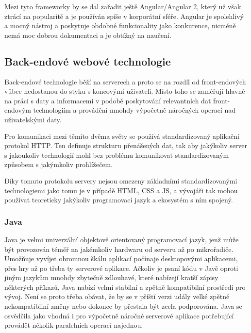 		Mezi tyto frameworky by se dal zařadit ještě Angular/Angular 2, který už však ztrácí na popularitě a je používán spíše v
		korporátní sféře.
		Angular je spolehlivý a mocný nástroj a poskytuje obdobné funkcionality jako konkurence,
		nicméně nemá moc dobrou dokumentaci a je obtížný na naučení. \cite{react_vs_angular}

	\subsection{Back-endové webové technologie}

	Back-endové technologie běží na serverech a proto se na rozdíl od front-endových vůbec nedostanou do styku s koncovými uživateli.
	Místo toho se zaměřují hlavně na práci s daty a informacemi v podobě poskytování relevantních dat front-endovým
	technologiím a provádění mnohdy výpočetně náročných operací nad uživatelskými daty.

	Pro komunikaci mezi těmito dvěma světy se používá standardizovaný aplikační protokol \noindent\Ac{HTTP}.
	Ten definuje strukturu přenášených dat, tak aby jakýkoliv server s jakoukoliv technologií mohl bez problému komunikovat
	standardizovaným způsobem s jakýmkoliv prohlížečem. \cite{http}

	Díky tomuto protokolu servery nejsou omezeny základními standardizovanými technologiemi jako tomu je v případě
	\Ac{HTML}, \Ac{CSS} a \ac{JS}, a vývojáři tak mohou používat teoreticky jakýkoliv programovací jazyk a ekosystém s ním
	spojený.

		\subsubsection{Java}

		Java je velmi univerzální objektově orientovaný programovací jazyk, jenž může být provozován téměř na jakémkoliv
		hardwaru od serveru až po mikrořadiče.
		Umožňuje vyvíjet ohromnou škálu aplikací počínaje desktopovými aplikacemi, přes hry až po třeba ty
		serverové aplikace. \cite{java}
		Ačkoliv je psaní kódu v Javě oproti jiným jazykům mnohdy zbytečně zdlouhavé, které nabízejí kratší zápisy
		některých příkazů, Java nabízí velmi stabilní a zpětně kompatibilní prostředí pro vývoj.
		Není se proto třeba obávat, že by se v příští verzi udály velké zpětně nekompatibilní změny nebo dokonce
		by přestala být zcela podporována.
		Java se osvědčila jako vhodná i pro výpočetně náročné serverové aplikace potřebující provádět několik paralelních
		operací najednou.

